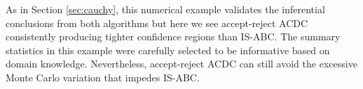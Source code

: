 As in Section \ref{sec:cauchy}, this numerical example validates the inferential conclusions from both algorithms but here we see accept-reject ACDC %
consistently producing tighter confidence regions than IS-ABC. The summary statistics in this example were carefully selected to be informative based on domain knowledge. Nevertheless, accept-reject ACDC can still avoid the excessive Monte Carlo variation that impedes IS-ABC.


